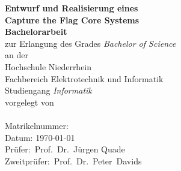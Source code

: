 \begin{titlepage}
	
\begin{center}
		\textbf{\Large Entwurf und Realisierung eines}\\
		\textbf{\Large Capture the Flag Core Systems}\\[3cm]
		\textbf{Bachelorarbeit}\\
		zur Erlangung des Grades {\em Bachelor of Science}\\[1.5cm]
		
		an der\\
		Hochschule Niederrhein\\
		Fachbereich Elektrotechnik und Informatik\\
		Studiengang {\em Informatik}\\[3cm]
		
		vorgelegt von\\
		\thesisAuthor\\
		Matrikelnummer: \Matrikelnummer\\[3cm]
		Datum: \today\\[3cm]
		
		Prüfer:~Prof.~Dr.~Jürgen Quade\\
		Zweitprüfer:~Prof.~Dr.~Peter~Davids
	\end{center}
\end{titlepage}